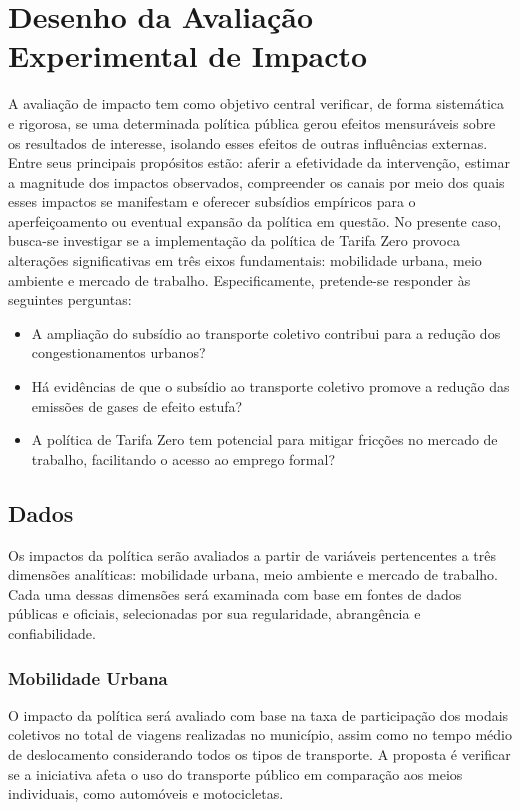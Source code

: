 
\section{Desenho da Avaliação Experimental de Impacto}
A avaliação de impacto tem como objetivo central verificar, de forma sistemática e rigorosa, se uma determinada política pública gerou efeitos mensuráveis sobre os resultados de interesse, isolando esses efeitos de outras influências externas. Entre seus principais propósitos estão: aferir a efetividade da intervenção, estimar a magnitude dos impactos observados, compreender os canais por meio dos quais esses impactos se manifestam e oferecer subsídios empíricos para o aperfeiçoamento ou eventual expansão da política em questão. No presente caso, busca-se investigar se a implementação da política de Tarifa Zero provoca alterações significativas em três eixos fundamentais: mobilidade urbana, meio ambiente e mercado de trabalho. Especificamente, pretende-se responder às seguintes perguntas:

\begin{itemize} 
    \item A ampliação do subsídio ao transporte coletivo contribui para a redução dos congestionamentos urbanos? 
    \item Há evidências de que o subsídio ao transporte coletivo promove a redução das emissões de gases de efeito estufa? 
    \item A política de Tarifa Zero tem potencial para mitigar fricções no mercado de trabalho, facilitando o acesso ao emprego formal? 
\end{itemize}

\subsection{Dados}

Os impactos da política serão avaliados a partir de variáveis pertencentes a três dimensões analíticas: mobilidade urbana, meio ambiente e mercado de trabalho. Cada uma dessas dimensões será examinada com base em fontes de dados públicas e oficiais, selecionadas por sua regularidade, abrangência e confiabilidade.

\subsubsection{Mobilidade Urbana}
O impacto da política será avaliado com base na taxa de participação dos modais coletivos no total de viagens realizadas no município, assim como no tempo médio de deslocamento considerando todos os tipos de transporte. A proposta é verificar se a iniciativa afeta o uso do transporte público em comparação aos meios individuais, como automóveis e motocicletas.

